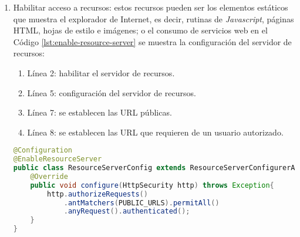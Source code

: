 \begin{enumerate}
	\item Habilitar acceso a recursos: estos recursos pueden ser los elementos estáticos que muestra el explorador de Internet, es decir, rutinas de \textit{Javascript}, páginas HTML, hojas de estilo e imágenes; o el consumo de servicios web en el Código \ref{lst:enable-resource-server} se muestra la configuración del servidor de recursos:

	\begin{enumerate}
		\item Línea 2: habilitar el servidor de recursos.
		\item Línea 5: configuración del servidor de recursos.
		\item Línea 7: se establecen las URL públicas.
		\item Línea 8: se establecen las URL que requieren de un usuario autorizado.
	\end{enumerate}

\begin{lstlisting}[language=Java, caption={Clase de configuración de servidor de recursos.}, captionpos=b, label={lst:enable-resource-server}]
@Configuration
@EnableResourceServer
public class ResourceServerConfig extends ResourceServerConfigurerAdapter{
	@Override
	public void configure(HttpSecurity http) throws Exception{
		http.authorizeRequests()
			.antMatchers(PUBLIC_URLS).permitAll()
			.anyRequest().authenticated();
	}
}
\end{lstlisting}
\end{enumerate}

